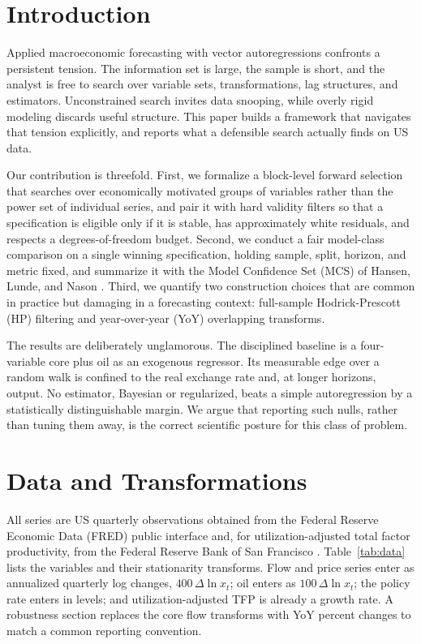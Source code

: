 \documentclass[conference]{IEEEtran}
\begin{document}
\section{Introduction}
Applied macroeconomic forecasting with vector autoregressions confronts a persistent tension. The information set is large, the sample is short, and the analyst is free to search over variable sets, transformations, lag structures, and estimators. Unconstrained search invites data snooping, while overly rigid modeling discards useful structure. This paper builds a framework that navigates that tension explicitly, and reports what a defensible search actually finds on US data.

Our contribution is threefold. First, we formalize a block-level forward selection that searches over economically motivated groups of variables rather than the power set of individual series, and pair it with hard validity filters so that a specification is eligible only if it is stable, has approximately white residuals, and respects a degrees-of-freedom budget. Second, we conduct a fair model-class comparison on a single winning specification, holding sample, split, horizon, and metric fixed, and summarize it with the Model Confidence Set (MCS) of Hansen, Lunde, and Nason \cite{hln2011}. Third, we quantify two construction choices that are common in practice but damaging in a forecasting context: full-sample Hodrick-Prescott (HP) filtering \cite{hp1997} and year-over-year (YoY) overlapping transforms.

The results are deliberately unglamorous. The disciplined baseline is a four-variable core plus oil as an exogenous regressor. Its measurable edge over a random walk is confined to the real exchange rate and, at longer horizons, output. No estimator, Bayesian or regularized, beats a simple autoregression by a statistically distinguishable margin. We argue that reporting such nulls, rather than tuning them away, is the correct scientific posture for this class of problem.

\section{Data and Transformations}
All series are US quarterly observations obtained from the Federal Reserve Economic Data (FRED) public interface and, for utilization-adjusted total factor productivity, from the Federal Reserve Bank of San Francisco \cite{fernald2014}. Table~\ref{tab:data} lists the variables and their stationarity transforms. Flow and price series enter as annualized quarterly log changes, $400\,\Delta \ln x_t$; oil enters as $100\,\Delta \ln x_t$; the policy rate enters in levels; and utilization-adjusted TFP is already a growth rate. A robustness section replaces the core flow transforms with YoY percent changes to match a common reporting convention.
\end{document}
